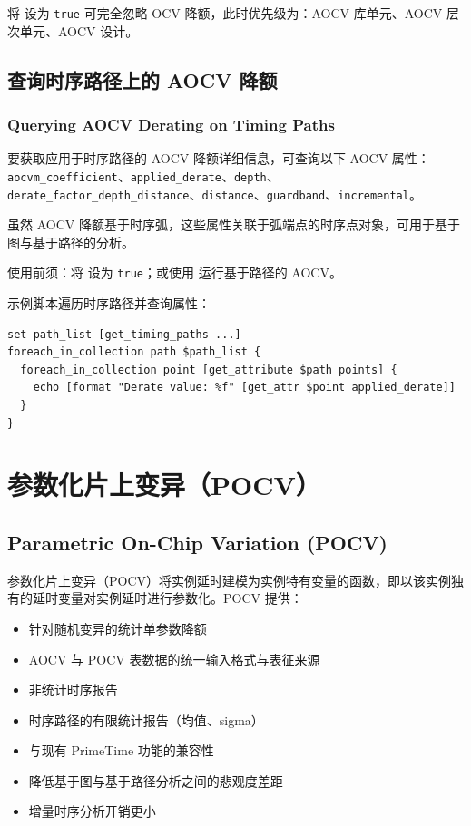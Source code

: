 将  设为 \texttt{true} 可完全忽略 OCV 降额，此时优先级为：AOCV 库单元、AOCV 层次单元、AOCV 设计。

\subsection{查询时序路径上的 AOCV 降额}
\subsubsection*{Querying AOCV Derating on Timing Paths}

要获取应用于时序路径的 AOCV 降额详细信息，可查询以下 AOCV 属性：\texttt{aocvm\_coefficient}、\texttt{applied\_derate}、\texttt{depth}、\texttt{derate\_factor\_depth\_distance}、\texttt{distance}、\texttt{guardband}、\texttt{incremental}。

虽然 AOCV 降额基于时序弧，这些属性关联于弧端点的时序点对象，可用于基于图与基于路径的分析。

使用前须：将  设为 \texttt{true}；或使用  运行基于路径的 AOCV。

示例脚本遍历时序路径并查询属性：
\begin{lstlisting}
set path_list [get_timing_paths ...]
foreach_in_collection path $path_list {
  foreach_in_collection point [get_attribute $path points] {
    echo [format "Derate value: %f" [get_attr $point applied_derate]]
  }
}
\end{lstlisting}


\section{参数化片上变异（POCV）}
\subsection*{Parametric On-Chip Variation (POCV)}

参数化片上变异（POCV）将实例延时建模为实例特有变量的函数，即以该实例独有的延时变量对实例延时进行参数化。POCV 提供：
\begin{itemize}
  \item 针对随机变异的统计单参数降额
  \item AOCV 与 POCV 表数据的统一输入格式与表征来源
  \item 非统计时序报告
  \item 时序路径的有限统计报告（均值、sigma）
  \item 与现有 PrimeTime 功能的兼容性
  \item 降低基于图与基于路径分析之间的悲观度差距
  \item 增量时序分析开销更小
\end{itemize}

